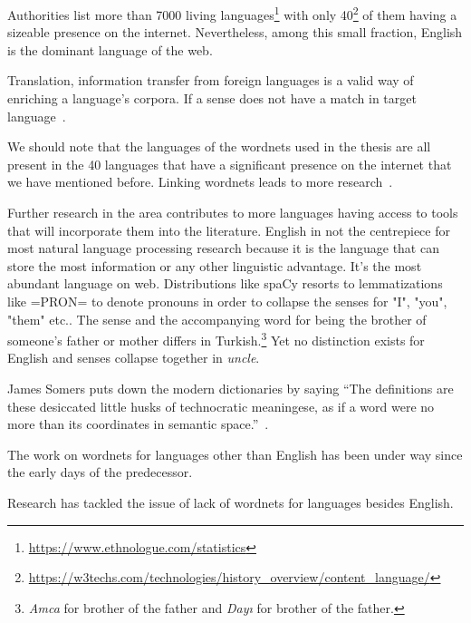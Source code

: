 Authorities list more than 7000 living languages\footnote{\url{https://www.ethnologue.com/statistics}} with only 40\footnote{\url{https://w3techs.com/technologies/history_overview/content_language/}} of them having a sizeable presence on the internet.
Nevertheless, among this small fraction, English is the dominant language of the web.

Translation, information transfer from foreign languages is a valid way of enriching a language's corpora. If a sense does not have a match in target language~\cite{ibrahim_usta_turkce_2006}.

We should note that the languages of the wordnets used in the thesis are all present in the 40 languages that have a significant presence on the internet that we have mentioned before.
Linking wordnets leads to more research~\cite{sagot_building_2008}.


Further research in the area contributes to more languages having access to tools that will incorporate them into the literature.
English in not the centrepiece for most natural language processing research because it is the language that can store the most information or any other linguistic advantage.
It's the most abundant language on web.
Distributions like spaCy resorts to lemmatizations like =PRON= to denote pronouns in order to collapse the senses for "I", "you", "them" etc.\@.
The sense and the accompanying word for being the brother of someone's father or mother differs in Turkish.\footnote{\emph{Amca} for brother of the father and \emph{Dayı} for brother of the father.}
Yet no distinction exists for English and senses collapse together in \emph{uncle}.


James Somers puts down the modern dictionaries by saying \enquote{The definitions are these desiccated little husks of technocratic meaningese, as if a word were no more than its coordinates in semantic space.}~\cite{somers_youre_2014}.

The work on wordnets for languages other than English has been under way since the early days of the predecessor.

Research has tackled the issue of lack of wordnets for languages besides English. %

